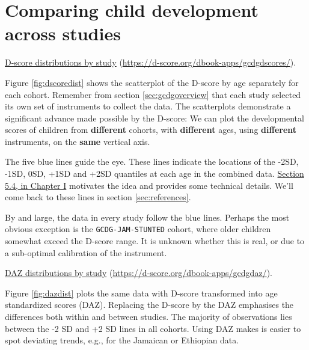 \documentclass[
]{book}
\begin{document}
\hypertarget{sec:dscores}{%
\section{Comparing child development across studies}\label{sec:dscores}}

\label{fig:dscoredist}\href{https://d-score.org/dbook-apps/gcdgdscores/\#display=by_cohort\&nrow=1\&ncol=1\&arr=row\&pg=6\&labels=cohort\&sort=cohort;asc\&filter=\&sidebar=\&fv=}{D-score distributions by study} (\url{https://d-score.org/dbook-apps/gcdgdscores/}).



Figure \ref{fig:dscoredist} shows the scatterplot of the D-score by age separately for each cohort. Remember from section \ref{sec:gcdgoverview} that each study selected its own set of instruments to collect the data. The scatterplots demonstrate a significant advance made possible by the D-score: We can plot the developmental scores of children from \textbf{different} cohorts, with \textbf{different} ages, using \textbf{different} instruments, on the \textbf{same} vertical axis.

The five blue lines guide the eye. These lines indicate the locations of the -2SD, -1SD, 0SD, +1SD and +2SD quantiles at each age in the combined data. \href{https://d-score.org/dbook1/sec-reference.html}{Section 5.4, in Chapter I} motivates the idea and provides some technical details. We'll come back to these lines in section \ref{sec:references}.

By and large, the data in every study follow the blue lines. Perhaps the most obvious exception is the \texttt{GCDG-JAM-STUNTED} cohort, where older children somewhat exceed the D-score range. It is unknown whether this is real, or due to a sub-optimal calibration of the instrument.

\label{fig:dazdist}\href{https://d-score.org/dbook-apps/gcdgdaz/\#display=by_cohort\&nrow=1\&ncol=1\&arr=row\&pg=6\&labels=cohort\&sort=cohort;asc\&filter=\&sidebar=\&fv=}{DAZ distributions by study} (\url{https://d-score.org/dbook-apps/gcdgdaz/}).



Figure \ref{fig:dazdist} plots the same data with D-score transformed into age standardized scores (DAZ). Replacing the D-score by the DAZ emphasises the differences both within and between studies. The majority of observations lies between the -2 SD and +2 SD lines in all cohorts. Using DAZ makes is easier to spot deviating trends, e.g., for the Jamaican or Ethiopian data.
\end{document}
